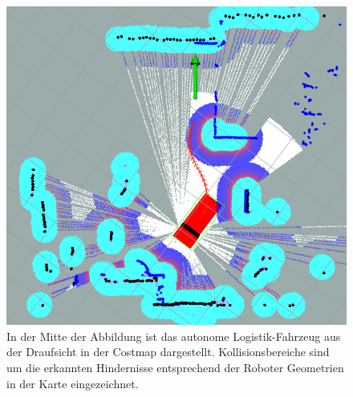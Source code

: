 \documentclass[12pt,a4paper,oneside,numbers=noenddot,headsepline,captions=tableheading,toc=bibliography,openany]{article}
\begin{document}
\begin{titlepage}
\begin{figure}[H]
	\includegraphics[width=\columnwidth]{trajektorie}
	\centering
	
	\caption{In der Mitte der Abbildung ist das autonome Logistik-Fahrzeug aus der Draufsicht in der Costmap dargestellt. Kollisionsbereiche sind um die erkannten Hindernisse entsprechend der Roboter Geometrien in der Karte eingezeichnet.}
	\label{fig: trajektorie}
\end{figure}




		
\end{titlepage}
\onehalfspacing
\cleardoublepage
%
\cleardoublepage
 
 \cleardoublepage

\end{document}
